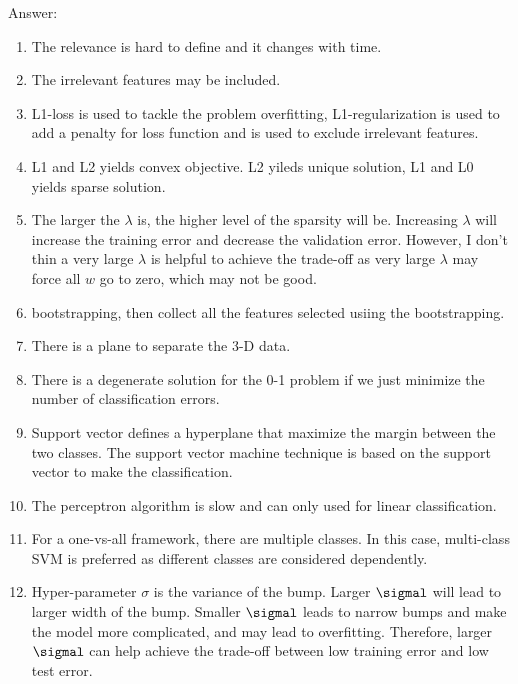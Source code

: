 \documentclass{article}
\def\gre#1{{\color{gre}#1}}
\begin{document}
\gre{
Answer:
\begin{enumerate}
    \item The relevance is hard to define and it changes with time.
    \item The irrelevant features may be included.
    \item L1-loss is used to tackle the problem overfitting, L1-regularization is used to add a penalty for loss function and is used to exclude irrelevant features.
    \item L1 and L2 yields convex objective. L2 yileds unique solution, L1 and L0 yields sparse solution.
    \item The larger the $\lambda$ is, the higher level of the sparsity will be. Increasing $\lambda$ will increase the training error and decrease the validation error. However, I don't thin a very large $\lambda$ is helpful to achieve the trade-off as very large $\lambda$ may force all $w$ go to zero, which may not be good.
    \item bootstrapping, then collect all the features selected usiing the bootstrapping.
    \item There is a plane to separate the 3-D data.
    \item There is a degenerate solution for the 0-1 problem if we just minimize the number of classification errors.
    \item Support vector defines a hyperplane that maximize the margin between the two classes. The support vector machine technique is based on the support vector to make the classification.
    \item The perceptron algorithm is slow and can only used for linear classification.
    \item For a one-vs-all framework, there are multiple classes. In this case, multi-class SVM is preferred as different classes are considered dependently.
    \item Hyper-parameter $\sigma$ is the variance of the bump. Larger $\sigmal$ will lead to larger width of the bump. Smaller $\sigmal$ leads to narrow bumps and make the model more complicated, and may lead to overfitting. Therefore, larger $\sigmal$ can help achieve the trade-off between low training error and low test error.
\end{enumerate}
}
\end{document}
